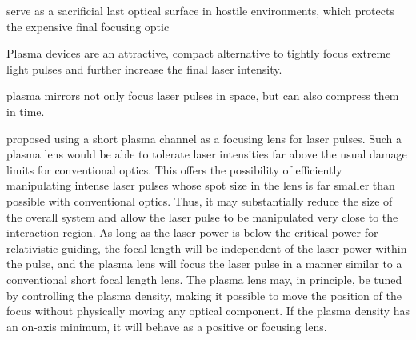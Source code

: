 serve as a sacrificial last optical surface in hostile environments, which protects the expensive final focusing optic

Plasma devices are an attractive, compact alternative to tightly focus extreme light pulses and further increase the final laser intensity.

plasma mirrors not only focus laser pulses in space, but can also compress them in time.


proposed using a short plasma channel as a focusing lens for laser pulses. Such a plasma lens would be able to tolerate laser intensities far above the usual damage limits for conventional optics. This offers the possibility of efficiently manipulating intense laser pulses whose spot size in the lens is far smaller than possible with conventional optics. Thus, it may substantially reduce the size of the overall system and allow the laser pulse to be manipulated very close to the interaction region. As long as the laser power is below the critical power for relativistic guiding, the focal length will be independent of the laser power within the pulse, and the plasma lens will focus the laser pulse in a manner similar to a conventional short focal length lens. The plasma lens may, in principle, be tuned by controlling the plasma density, making it possible to move the position of the focus without physically moving any optical component. If the plasma density has an on-axis minimum, it will behave as a positive or focusing lens.

